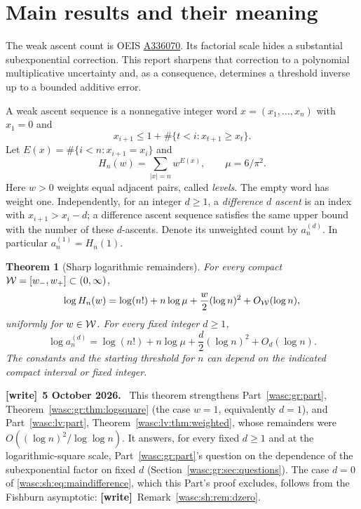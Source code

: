 \documentclass[11pt,a4paper]{article}
\newtheorem{theorem}{Theorem}[section]
\theoremstyle{remark}\newtheorem{remark}[theorem]{Remark}
\numberwithin{equation}{section}
\newenvironment{writenote}[1][]{\par\smallskip\begingroup\small
 \noindent\textbf{[write]}\if\relax\detokenize{#1}\relax\else~\textbf{#1.}\fi\ }%
 {\par\endgroup\smallskip}
\newcommand{\wtag}{\textup{\textbf{[write]}}}
\begin{document}
\section{Main results and their meaning}\label{wasc:sh:sec:results}
The weak ascent count is OEIS \href{https://oeis.org/A336070}{A336070}. Its factorial scale hides a substantial subexponential correction. This report sharpens that correction to a polynomial multiplicative uncertainty and, as a consequence, determines a threshold inverse up to a bounded additive error.

A weak ascent sequence is a nonnegative integer word $x=(x_1,\ldots,x_n)$ with $x_1=0$ and
\[
x_{i+1}\le 1+\#\{t<i:x_{t+1}\ge x_t\}.
\]
Let $E(x)=\#\{i<n:x_{i+1}=x_i\}$ and
\[
H_n(w)=\sum_{|x|=n}w^{E(x)},\qquad \mu=6/\pi^2.
\]
Here $w>0$ weights equal adjacent pairs, called \emph{levels}. The empty word has weight one. Independently, for an integer $d\ge1$, a \emph{difference $d$ ascent} is an index with $x_{i+1}>x_i-d$; a difference ascent sequence satisfies the same upper bound with the number of these $d$-ascents. Denote its unweighted count by $a_n^{(d)}$. In particular $a_n^{(1)}=H_n(1)$.

\begin{theorem}[Sharp logarithmic remainders]\label{wasc:sh:thm:main}
For every compact $\mathcal W=[w_-,w_+]\subset(0,\infty)$,
\begin{equation}\label{wasc:sh:eq:mainweighted}
\log H_n(w)=\log(n!)+n\log\mu+\frac w2(\log n)^2+O_{\mathcal W}(\log n),
\end{equation}
uniformly for $w\in\mathcal W$. For every fixed integer $d\ge1$,
\begin{equation}\label{wasc:sh:eq:maindifference}
\log a_n^{(d)}=\log(n!)+n\log\mu+\frac d2(\log n)^2+O_d(\log n).
\end{equation}
The constants and the starting threshold for $n$ can depend on the indicated compact interval or fixed integer.
\end{theorem}
\begin{writenote}[5 October 2026]
This theorem strengthens Part~\ref{wasc:gr:part}, Theorem~\ref{wasc:gr:thm:logsquare} (the case $w=1$, equivalently $d=1$), and Part~\ref{wasc:lv:part}, Theorem~\ref{wasc:lv:thm:weighted}, whose remainders were $O((\log n)^2/\log\log n)$. It answers, for every fixed $d\ge1$ and at the logarithmic-square scale, Part~\ref{wasc:gr:part}'s question on the dependence of the subexponential factor on fixed $d$ (Section~\ref{wasc:gr:sec:questions}). The case $d=0$ of \eqref{wasc:sh:eq:maindifference}, which this Part's proof excludes, follows from the Fishburn asymptotic: \wtag\ Remark~\ref{wasc:sh:rem:dzero}.
\end{writenote}
\end{document}
